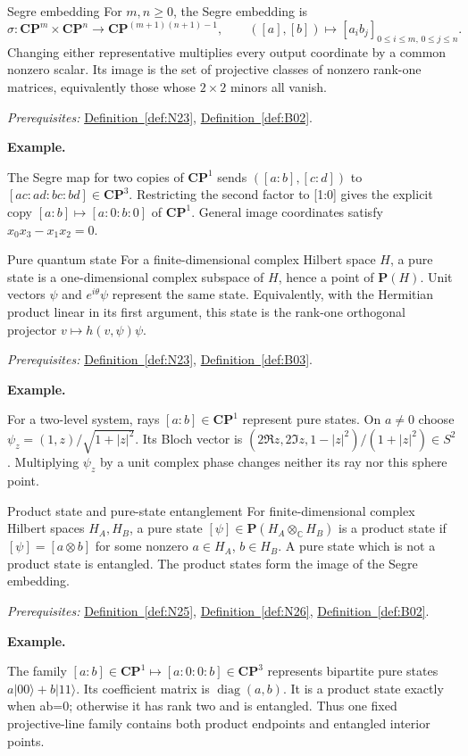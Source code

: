 \documentclass[11pt]{article}
\makeatletter
\newcommand{\C}{\mathbb C}
\newcounter{definition}
\newcommand{\CP}{\mathbf{CP}}
\newcommand{\exampleheading}{\par\medskip\textbf{Example.}\par\smallskip}
\newcommand{\currentdefinition}[1]{\protected@edef\@currentlabel{#1}}
\makeatother
\begin{document}
\begin{definitionbox}{Segre embedding}
\currentdefinition{\thedefinition}
\label{def:N25}
For $m,n\ge0$, the Segre embedding is
\[\sigma:\CP^m\times\CP^n\longrightarrow\CP^{(m+1)(n+1)-1},\qquad([a],[b])\longmapsto[a_i b_j]_{0\le i\le m,\,0\le j\le n}.\]
Changing either representative multiplies every output coordinate by a common nonzero scalar. Its image is the set of projective classes of nonzero rank-one matrices, equivalently those whose $2\times2$ minors all vanish.

\smallskip
\textit{Prerequisites:} \hyperref[def:N23]{Definition~\ref*{def:N23}}, \hyperref[def:B02]{Definition~\ref*{def:B02}}.

\exampleheading
The Segre map for two copies of $\CP^1$ sends $([a:b],[c:d])$ to $[ac:ad:bc:bd]\in\CP^3$. Restricting the second factor to [1:0] gives the explicit copy $[a:b]\mapsto[a:0:b:0]$ of $\CP^1$. General image coordinates satisfy $x_0x_3-x_1x_2=0$.
\end{definitionbox}

\begin{definitionbox}{Pure quantum state}
\currentdefinition{\thedefinition}
\label{def:N26}
For a finite-dimensional complex Hilbert space $H$, a pure state is a one-dimensional complex subspace of $H$, hence a point of $\mathbf P(H)$. Unit vectors $\psi$ and $e^{i\theta}\psi$ represent the same state. Equivalently, with the Hermitian product linear in its first argument, this state is the rank-one orthogonal projector $v\mapsto h(v,\psi)\psi$.

\smallskip
\textit{Prerequisites:} \hyperref[def:N23]{Definition~\ref*{def:N23}}, \hyperref[def:B03]{Definition~\ref*{def:B03}}.

\exampleheading
For a two-level system, rays $[a:b]\in\CP^1$ represent pure states. On $a\ne0$ choose $\psi_z=(1,z)/\sqrt{1+|z|^2}$. Its Bloch vector is $(2\Re z,2\Im z,1-|z|^2)/(1+|z|^2)\in S^2$. Multiplying $\psi_z$ by a unit complex phase changes neither its ray nor this sphere point.
\end{definitionbox}

\begin{definitionbox}{Product state and pure-state entanglement}
\currentdefinition{\thedefinition}
\label{def:N27}
For finite-dimensional complex Hilbert spaces $H_A,H_B$, a pure state $[\psi]\in\mathbf P(H_A\otimes_{\C}H_B)$ is a product state if $[\psi]=[a\otimes b]$ for some nonzero $a\in H_A$, $b\in H_B$. A pure state which is not a product state is entangled. The product states form the image of the Segre embedding.

\smallskip
\textit{Prerequisites:} \hyperref[def:N25]{Definition~\ref*{def:N25}}, \hyperref[def:N26]{Definition~\ref*{def:N26}}, \hyperref[def:B02]{Definition~\ref*{def:B02}}.

\exampleheading
The family $[a:b]\in\CP^1\mapsto[a:0:0:b]\in\CP^3$ represents bipartite pure states $a|00\rangle+b|11\rangle$. Its coefficient matrix is $\operatorname{diag}(a,b)$. It is a product state exactly when ab=0; otherwise it has rank two and is entangled. Thus one fixed projective-line family contains both product endpoints and entangled interior points.
\end{definitionbox}
\end{document}
